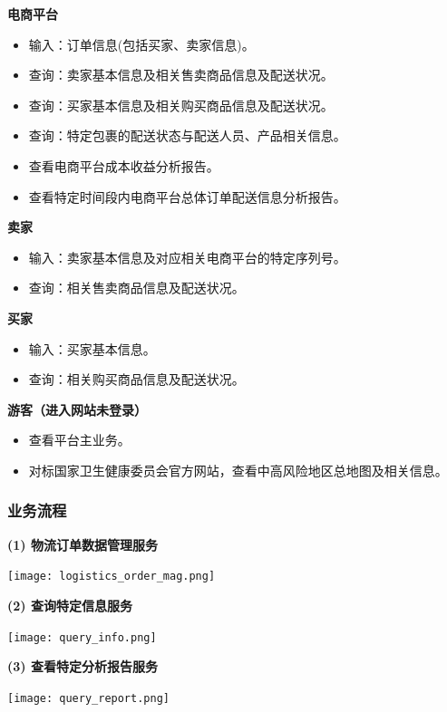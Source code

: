 \documentclass[12pt]{article}
\begin{document}
\noindent \textbf{电商平台}
\begin{itemize}
	\item 输入：订单信息(包括买家、卖家信息)。
	\item 查询：卖家基本信息及相关售卖商品信息及配送状况。
	\item 查询：买家基本信息及相关购买商品信息及配送状况。
	\item 查询：特定包裹的配送状态与配送人员、产品相关信息。
	\item 查看电商平台成本收益分析报告。
	\item 查看特定时间段内电商平台总体订单配送信息分析报告。
\end{itemize}

\noindent \textbf{卖家}
\begin{itemize}
	\item 输入：卖家基本信息及对应相关电商平台的特定序列号。
	\item 查询：相关售卖商品信息及配送状况。
\end{itemize}

\noindent \textbf{买家}
\begin{itemize}
	\item 输入：买家基本信息。
	\item 查询：相关购买商品信息及配送状况。
\end{itemize}

\noindent \textbf{游客（进入网站未登录）}
\begin{itemize}
	\item 查看平台主业务。
	\item 对标国家卫生健康委员会官方网站，查看中高风险地区总地图及相关信息。
\end{itemize}

\subsubsection{业务流程}

\noindent \textbf{(1) 物流订单数据管理服务}
\begin{center}
	\texttt{[image: logistics\_order\_mag.png]}
\end{center}

\noindent \textbf{(2) 查询特定信息服务}
\begin{center}
	\texttt{[image: query\_info.png]}
\end{center}

\noindent \textbf{(3) 查看特定分析报告服务}
\begin{center}
	\texttt{[image: query\_report.png]}
\end{center}
\end{document}
